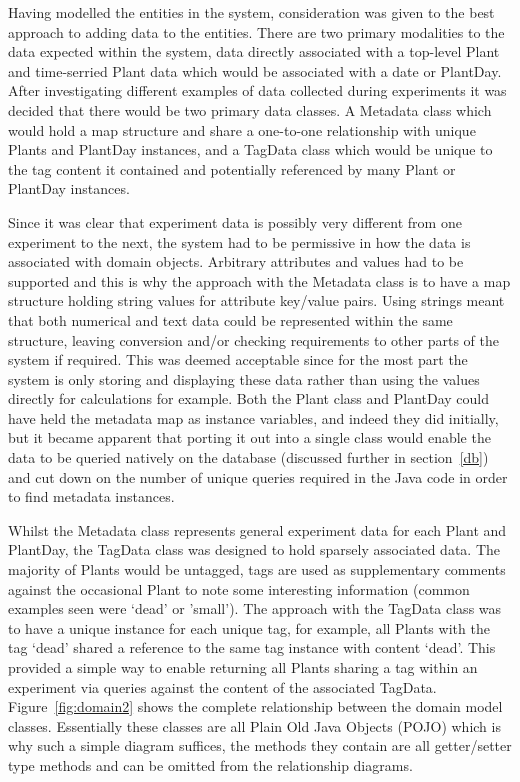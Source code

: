Having modelled the entities in the system, consideration was given to the best approach to adding data to the entities. There are two primary modalities to the data expected within the system, data directly associated with a top-level Plant and time-serried Plant data which would be associated with a date or PlantDay. After investigating different examples of data collected during experiments it was decided that there would be two primary data classes. A Metadata class which would hold a map structure and share a one-to-one relationship with unique Plants and PlantDay instances, and a TagData class which would be unique to the tag content it contained and potentially referenced by many Plant or PlantDay instances.

Since it was clear that experiment data is possibly very different from one experiment to the next, the system had to be permissive in how the data is associated with domain objects. Arbitrary attributes and values had to be supported and this is why the approach with the Metadata class is to have a map structure holding string values for attribute key/value pairs. Using strings meant that both numerical and text data could be represented within the same structure, leaving conversion and/or checking requirements to other parts of the system if required. This was deemed acceptable since for the most part the system is only storing and displaying these data rather than using the values directly for calculations for example. Both the Plant class and PlantDay could have held the metadata map as instance variables, and indeed they did initially, but it became apparent that porting it out into a single class would enable the data to be queried natively on the database (discussed further in section~\ref{db}) and cut down on the number of unique queries required in the Java code in order to find metadata instances.

Whilst the Metadata class represents general experiment data for each Plant and PlantDay, the TagData class was designed to hold sparsely associated data. The majority of Plants would be untagged, tags are used as supplementary comments against the occasional Plant to note some interesting information (common examples seen were `dead' or 'small'). The approach with the TagData class was to have a unique instance for each unique tag, for example, all Plants with the tag `dead' shared a reference to the same tag instance with content `dead'. This provided a simple way to enable returning all Plants sharing a tag within an experiment via queries against the content of the associated TagData. Figure~\ref{fig:domain2} shows the complete relationship between the domain model classes. Essentially these classes are all Plain Old Java Objects (POJO) which is why such a simple diagram suffices, the methods they contain are all getter/setter type methods and can be omitted from the relationship diagrams.


